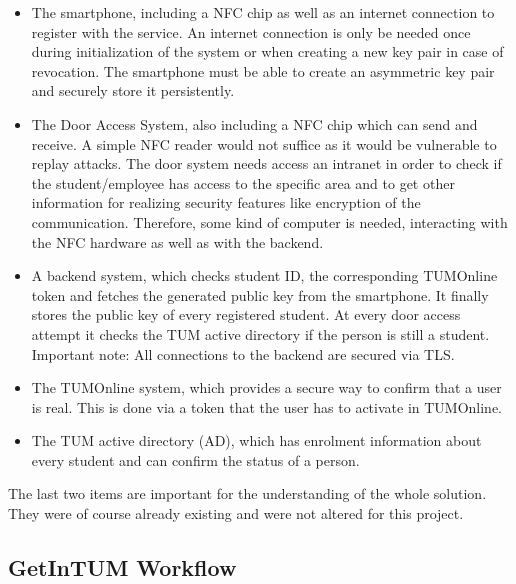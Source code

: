 \begin{itemize}
\item The smartphone, including a NFC chip as well as an internet connection to register with the service.
An internet connection is only be needed once during initialization of the system or when creating a new key pair in case of revocation.
The smartphone must be able to create an asymmetric key pair and securely store it persistently.
\item The Door Access System, also including a NFC chip which can send and receive.
A simple NFC reader would not suffice as it would be vulnerable to replay attacks.
The door system needs access an intranet in order to check if the student/employee has access to the specific area and to get other information for realizing security features like encryption of the communication.
Therefore, some kind of computer is needed, interacting with the NFC hardware as well as with the backend.
\item A backend system, which checks student ID, the corresponding TUMOnline token and fetches the generated public key from the smartphone.
It finally stores the public key of every registered student.
At every door access attempt it checks the TUM active directory if the person is still a student.\\
Important note: All connections to the backend are secured via TLS.
\item The TUMOnline system, which provides a secure way to confirm that a user is real.
This is done via a token that the user has to activate in TUMOnline.
\item The TUM active directory (AD), which has enrolment information about every student and can confirm the status of a person.
\end{itemize} 
The last two items are important for the understanding of the whole solution. They were of course already existing and were not altered for this project.

\bigskip




\subsection{GetInTUM Workflow}\label{sec:workflow}

